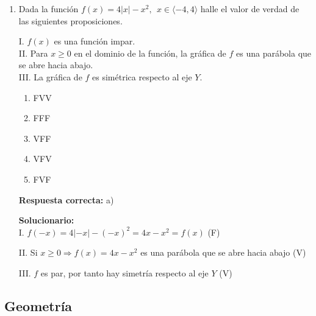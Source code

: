 \begin{enumerate}
	\vspace{6mm}
	
	\item Dada la función $f(x)=4|x|-x^2,\ \ x\in\langle -4,4\rangle$ halle el valor de verdad de las siguientes proposiciones.
	
	I. $f(x)$ es una función impar.\\
	II. Para $x\geq 0$ en el dominio de la función, la gráfica de $f$ es una parábola que se abre hacia abajo.\\
	III. La gráfica de $f$ es simétrica respecto al eje $Y$.
	
	\begin{enumerate}[label=\alph*)]
		\item FVV
		\item FFF
		\item VFF
		\item VFV
		\item FVF
	\end{enumerate}
	\textbf{Respuesta correcta:} a)
	
	\vspace{2mm}
	\textbf{Solucionario:}\\
	
	I. $f(-x)=4|-x|-(-x)^2=4x-x^2=f(x)$ \hfill (F)
	
	II. Si $x\geq 0 \Rightarrow f(x)=4x-x^2$ es una parábola que se abre hacia abajo \hfill (V)
	
	III. $f$ es par, por tanto hay simetría respecto al eje $Y$ \hfill (V)
	
	\vspace{6mm}
	
\end{enumerate}






\subsection*{Geometría}

